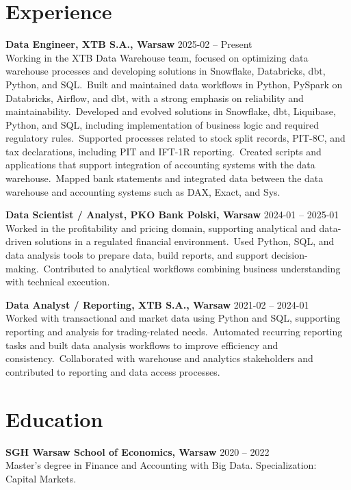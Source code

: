 \documentclass[a4paper,11pt]{article}
\begin{document}
\section*{Experience}
\textbf{Data Engineer, XTB S.A., Warsaw} \hfill 2025-02 -- Present\\
Working in the XTB Data Warehouse team, focused on optimizing data warehouse processes and developing solutions in Snowflake, Databricks, dbt, Python, and SQL.\
Built and maintained data workflows in Python, PySpark on Databricks, Airflow, and dbt, with a strong emphasis on reliability and maintainability.\
Developed and evolved solutions in Snowflake, dbt, Liquibase, Python, and SQL, including implementation of business logic and required regulatory rules.\
Supported processes related to stock split records, PIT-8C, and tax declarations, including PIT and IFT-1R reporting.\
Created scripts and applications that support integration of accounting systems with the data warehouse.\
Mapped bank statements and integrated data between the data warehouse and accounting systems such as DAX, Exact, and Sys.

\vspace{2mm}
\textbf{Data Scientist / Analyst, PKO Bank Polski, Warsaw} \hfill 2024-01 -- 2025-01\\
Worked in the profitability and pricing domain, supporting analytical and data-driven solutions in a regulated financial environment.\
Used Python, SQL, and data analysis tools to prepare data, build reports, and support decision-making.\
Contributed to analytical workflows combining business understanding with technical execution.

\vspace{2mm}
\textbf{Data Analyst / Reporting, XTB S.A., Warsaw} \hfill 2021-02 -- 2024-01\\
Worked with transactional and market data using Python and SQL, supporting reporting and analysis for trading-related needs.\
Automated recurring reporting tasks and built data analysis workflows to improve efficiency and consistency.\
Collaborated with warehouse and analytics stakeholders and contributed to reporting and data access processes.

\section*{Education}
\textbf{SGH Warsaw School of Economics, Warsaw} \hfill 2020 -- 2022\\
Master's degree in Finance and Accounting with Big Data. Specialization: Capital Markets.
\end{document}
